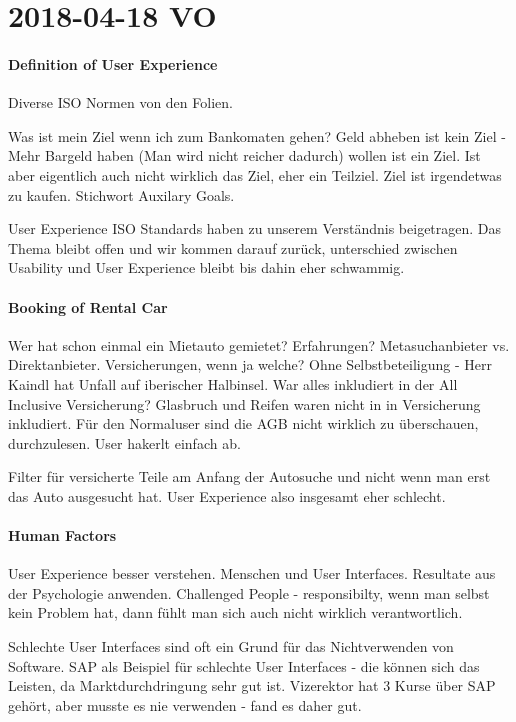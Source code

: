 \section{2018-04-18 VO}
\paragraph{Definition of User Experience}

Diverse ISO Normen von den Folien.

Was ist mein Ziel wenn ich zum Bankomaten gehen?
Geld abheben ist kein Ziel - Mehr Bargeld haben (Man wird nicht reicher dadurch)
wollen ist ein Ziel. Ist aber eigentlich auch nicht wirklich das Ziel, eher ein
Teilziel. Ziel ist irgendetwas zu kaufen. Stichwort Auxilary Goals.

User Experience ISO Standards haben zu unserem Verständnis beigetragen.
Das Thema bleibt offen und wir kommen darauf zurück, unterschied zwischen
Usability und User Experience bleibt bis dahin eher schwammig.

\paragraph{Booking of Rental Car}
Wer hat schon einmal ein Mietauto gemietet? Erfahrungen? Metasuchanbieter vs.
Direktanbieter.
Versicherungen, wenn ja welche? Ohne Selbstbeteiligung - Herr Kaindl hat Unfall
auf iberischer Halbinsel. 
War alles inkludiert in der All Inclusive Versicherung? Glasbruch und Reifen
waren nicht in in Versicherung inkludiert. Für den Normaluser sind die AGB
nicht wirklich zu überschauen, durchzulesen. User hakerlt einfach ab.

Filter für versicherte Teile am Anfang der Autosuche und nicht wenn man erst 
das Auto ausgesucht hat. User Experience also insgesamt eher schlecht.

\paragraph{Human Factors}
User Experience besser verstehen. Menschen und User Interfaces. Resultate
aus der Psychologie anwenden. 
Challenged People - responsibilty, wenn man selbst kein Problem hat, dann fühlt
man sich auch nicht wirklich verantwortlich.

Schlechte User Interfaces sind oft ein Grund für das Nichtverwenden von Software.
SAP als Beispiel für schlechte User Interfaces - die können sich das Leisten,
da Marktdurchdringung sehr gut ist. Vizerektor hat 3 Kurse über SAP gehört, aber
musste es nie verwenden - fand es daher gut.

